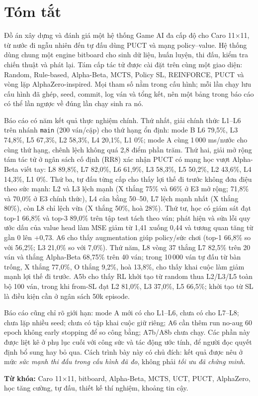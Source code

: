 \chapter*{Tóm tắt}

Đồ án xây dựng và đánh giá một hệ thống Game AI đa cấp độ cho Caro 11×11, từ nước đi ngẫu
nhiên đến tự đấu dùng PUCT và mạng policy--value. Hệ thống dùng chung một engine bitboard cho
sinh dữ liệu, huấn luyện, thi đấu, kiểm tra chiến thuật và phát lại. Tám cấp tác tử được cài
đặt trên cùng một giao diện: Random, Rule-based, Alpha-Beta, MCTS, Policy SL, REINFORCE, PUCT
và vòng lặp AlphaZero-inspired. Mọi tham số nằm trong cấu hình; mỗi lần chạy lưu cấu hình đã
ghép, seed, commit, log ván và tổng kết, nên một bảng trong báo cáo có thể lần ngược về đúng
lần chạy sinh ra nó.

Báo cáo có năm kết quả thực nghiệm chính. Thứ nhất, giải chính thức L1--L6 trên nhánh
\texttt{main} (200 ván/cặp) cho thứ hạng ổn định: mode B L6 79,5\%, L3 74,8\%, L5 67,3\%, L2
58,3\%, L4 20,1\%, L1 0\%; mode A cùng 1\,000 ms/nước cho cùng thứ hạng, chênh lệch không quá
2,8 điểm phần trăm. Thứ hai, giải mở rộng tám tác tử ở ngân sách cố định (RR8) xác nhận PUCT
có mạng học vượt Alpha-Beta viết tay: L8 89,8\%, L7 82,0\%, L6 61,9\%, L3 58,3\%, L5 50,2\%,
L2 43,6\%, L4 14,3\%, L1 0\%. Thứ ba, tự đấu từng cấp cho thấy lợi thế đi trước không đơn điệu
theo sức mạnh: L2 và L3 lệch mạnh (X thắng 75\% và 66\% ở E3 mở rộng; 71,8\% và 70,0\% ở E3
chính thức), L4 cân bằng 50--50, L7 lệch mạnh nhất (X thắng 80\%), còn L8 chỉ lệch vừa (X thắng
50\%, hoà 28\%). Thứ tư, học có giám sát đạt top-1 66,8\% và top-3 89,0\% trên tập test tách
theo ván; phát hiện và sửa lỗi quy ước dấu của value head làm MSE giảm từ 1,41 xuống 0,44 và
tương quan tăng từ gần 0 lên +0,73. A6 cho thấy augmentation giúp policy/sức chơi (top-1 66,8\%
so với 56,2\%; L3 21,0\% so với 7,0\%). Thứ năm, L8 vòng 37 thắng L7 82,5\% trên 20 ván và
thắng Alpha-Beta 68,75\% trên 40 ván; trong 10\,000 ván tự đấu từ bàn trống, X thắng 77,0\%,
O thắng 9,2\%, hoà 13,8\%, cho thấy khai cuộc làm giảm mạnh lợi thế đi trước. A5b cho thấy RL
khởi tạo từ random thua L2/L3/L5 toàn bộ 100 ván, trong khi from-SL đạt L2 81,0\%, L3 37,0\%,
L5 66,5\%; khởi tạo từ SL là điều kiện cần ở ngân sách 50k episode.

Báo cáo cũng chỉ rõ giới hạn: mode A mới có cho L1--L6, chưa có cho L7--L8; chưa lặp nhiều
seed; chưa có tập khai cuộc giữ riêng; A6 cần thêm run no-aug 60 epoch không early stopping để
so công bằng; A7b/A8b chưa chạy. Các phần này được liệt kê ở phụ lục cuối với công sức và tác
động ước tính, để người đọc quyết định bổ sung hay bỏ qua. Cách trình bày này có chủ đích: kết
quả được nêu ở mức \emph{sức mạnh thi đấu trong cấu hình đã đo}, không phải \emph{tối ưu đã
chứng minh}.

\noindent\textbf{Từ khóa:} Caro 11×11, bitboard, Alpha-Beta, MCTS, UCT, PUCT, AlphaZero, học
tăng cường, tự đấu, thiết kế thí nghiệm, khoảng tin cậy.